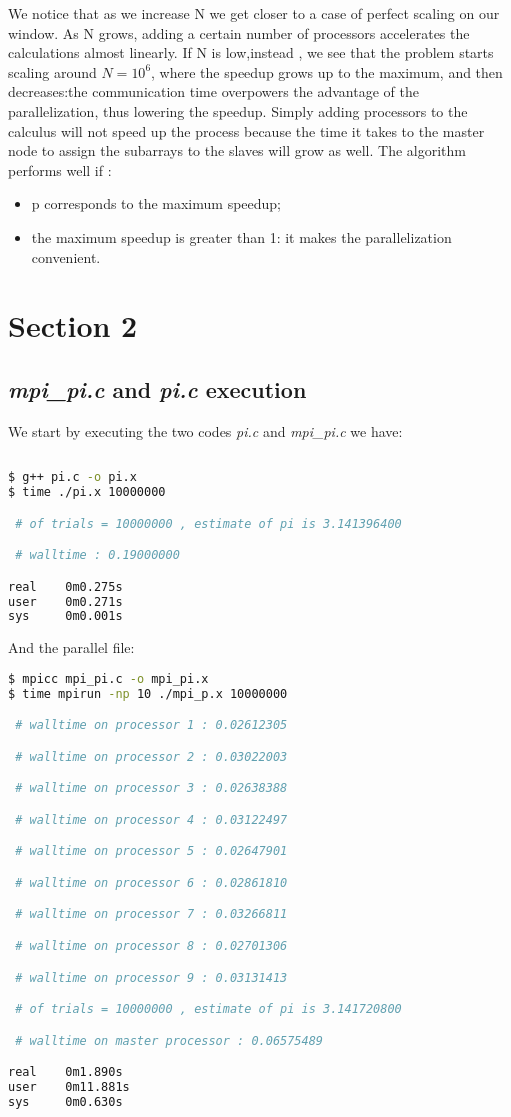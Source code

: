 \documentclass[11pt]{scrartcl} %
\begin{document}
We notice that as we increase N we get closer to a case of perfect scaling on our window. As N grows, adding a certain number of processors accelerates the calculations almost linearly.
If N is low,instead , we see that the problem starts scaling around $N=10^6$, where the speedup grows up to the maximum, and then decreases:the communication time overpowers the advantage of the parallelization, thus lowering the speedup.
 Simply adding processors to the calculus will not speed up the process because the time it takes to the master node to assign the subarrays to the slaves will grow as well.
The algorithm performs well if :
\begin{itemize}
	\item p corresponds to the maximum speedup;
	\item the maximum speedup is greater than 1: it makes the parallelization convenient.
\end{itemize}
\section{Section 2}

\subsection{\textit{mpi\_pi.c} and \textit{pi.c} execution}
We start by executing the two codes \textit{pi.c} and \textit{mpi\_pi.c} we have:

\begin{lstlisting}[language=bash]
  
$ g++ pi.c -o pi.x
$ time ./pi.x 10000000

 # of trials = 10000000 , estimate of pi is 3.141396400 

 # walltime : 0.19000000 

real    0m0.275s
user    0m0.271s
sys     0m0.001s
\end{lstlisting}
And the parallel file:
\begin{lstlisting}[language=bash]
$ mpicc mpi_pi.c -o mpi_pi.x
$ time mpirun -np 10 ./mpi_p.x 10000000

 # walltime on processor 1 : 0.02612305 

 # walltime on processor 2 : 0.03022003 

 # walltime on processor 3 : 0.02638388 

 # walltime on processor 4 : 0.03122497 

 # walltime on processor 5 : 0.02647901 

 # walltime on processor 6 : 0.02861810 

 # walltime on processor 7 : 0.03266811 

 # walltime on processor 8 : 0.02701306 

 # walltime on processor 9 : 0.03131413 

 # of trials = 10000000 , estimate of pi is 3.141720800 

 # walltime on master processor : 0.06575489 

real    0m1.890s
user    0m11.881s
sys     0m0.630s
\end{lstlisting}
\end{document}
